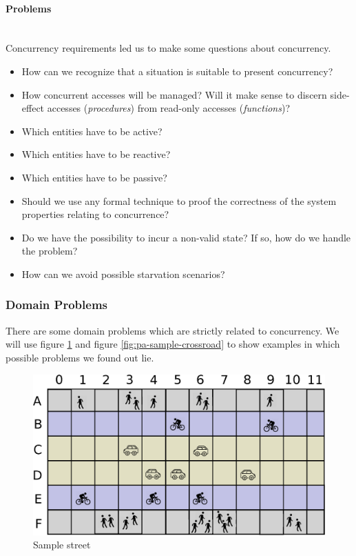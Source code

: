 \paragraph{Problems} \mbox{} \\

Concurrency requirements led us to make some questions about concurrency.

\begin{itemize}
\item How can we recognize that a situation is suitable to present concurrency?
\item How concurrent accesses will be managed? Will it make sense to discern
  side-effect accesses (\emph{procedures}) from read-only accesses
  (\emph{functions})?
\item Which entities have to be active?
\item Which entities have to be reactive?
\item Which entities have to be passive?
\item Should we use any formal technique to proof the correctness
of the system properties relating to concurrence?
\item Do we have the possibility to incur a non-valid state? If so, how do we
  handle the problem?
\item How can we avoid possible starvation scenarios?
\end{itemize}

\subsubsection{Domain Problems}\label{sec:pa-domain-problems}

There are some domain problems which are strictly related to concurrency.
We will use figure \ref{fig:pa-sample-street} and figure
\ref{fig:pa-sample-crossroad} to show examples in which possible problems we
found out lie.

\begin{figure}[H]
  \centering
  \includegraphics[width=.7\columnwidth]{images/analysis/street_base.eps}
  \caption{Sample street}
  \label{fig:pa-sample-street}
\end{figure}

